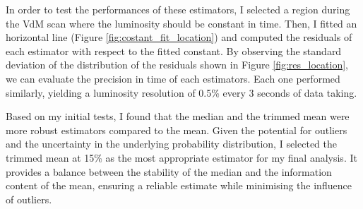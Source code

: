 In order to test the performances of these estimators, I selected a region during the VdM scan where the luminosity should be constant in time. Then, I fitted an horizontal line (Figure \ref{fig:costant_fit_location}) and computed the residuals of each estimator with respect to the fitted constant. By observing the standard deviation of the distribution of the residuals shown in Figure \ref{fig:res_location}, we can evaluate the precision in time of each estimators. Each one performed similarly, yielding a luminosity resolution of 0.5\% every 3 seconds of data taking.

Based on my initial tests, I found that the median and the trimmed mean were more robust estimators compared to the mean. Given the potential for outliers and the uncertainty in the underlying probability distribution, I selected the trimmed mean at 15\% as the most appropriate estimator for my final analysis. It provides a balance between the stability of the median and the information content of the mean, ensuring a reliable estimate while minimising the influence of outliers.

